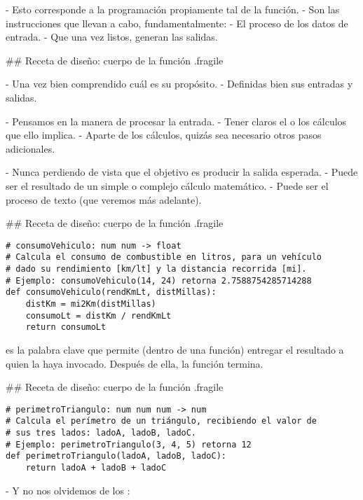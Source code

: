 - Esto corresponde a la programación propiamente tal de la función.
- Son las instrucciones que llevan a cabo, fundamentalmente:
    - El proceso de los datos de entrada.
    - Que una vez listos, generan las salidas.

## Receta de diseño: cuerpo de la función {.fragile}


- Una vez bien comprendido cuál es su propósito.
    - Definidas bien sus entradas y salidas.

- Pensamos en la manera de procesar la entrada.
    - Tener claros el o los cálculos que ello implica.
    - Aparte de los cálculos, quizás sea necesario otros pasos adicionales.

- Nunca perdiendo de vista que el objetivo es producir la salida esperada.
    - Puede ser el resultado de un simple o complejo cálculo matemático.
    - Puede ser el proceso de texto (que veremos más adelante).

## Receta de diseño: cuerpo de la función {.fragile}


\begin{lstlisting}[style=frame02]
# consumoVehiculo: num num -> float
# Calcula el consumo de combustible en litros, para un vehículo
# dado su rendimiento [km/lt] y la distancia recorrida [mi].
# Ejemplo: consumoVehiculo(14, 24) retorna 2.7588754285714288
def consumoVehiculo(rendKmLt, distMillas):
    distKm = mi2Km(distMillas)
    consumoLt = distKm / rendKmLt
    return consumoLt
\end{lstlisting}

\bgnblockdefinition
{} es la palabra clave que permite (dentro de una función)
entregar el resultado a quien la haya invocado. Después de ella, la función
termina.
\trmblockdefinition

## Receta de diseño: cuerpo de la función {.fragile}


\begin{lstlisting}[style=frame02]
# perimetroTriangulo: num num num -> num
# Calcula el perímetro de un triángulo, recibiendo el valor de
# sus tres lados: ladoA, ladoB, ladoC.
# Ejemplo: perimetroTriangulo(3, 4, 5) retorna 12
def perimetroTriangulo(ladoA, ladoB, ladoC):
    return ladoA + ladoB + ladoC
\end{lstlisting}

- Y no nos olvidemos de los :

